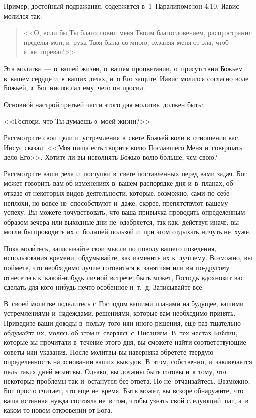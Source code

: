 \documentclass[12pt,article,a4paper,fittopage]{ncc}
\begin{document}
\begin{multicols}{2}
Пример, достойный подражания, содержится в~1~Паралипоменон 4:10. Иавис молился так: 

\begin{quote}
<<О, если бы Ты благословил меня Твоим благословением, распространил пределы мои, и~рука Твоя была со мною, охраняя меня от зла, чтоб я~не~горевал!>>
\end{quote}

 Эта молитва~--- о~вашей жизни, о~вашем процветании, о~присутствии Божьем в~вашем сердце и~в~ваших делах, и~о Его защите. Иавис молился согласно воле Божьей, и~Бог ниспослал ему, чего он просил.

Основной настрой третьей части этого дня молитвы должен быть: 
\begin{center}
<<Господи, что Ты думаешь о~моей жизни?>>
\end{center}
 Рассмотрите свои цели и~устремления в~свете Божьей воли в~отношении вас. Иисус сказал: <<Моя пища есть творить волю Пославшего Меня и~совершать дело Его>>. Хотите ли вы исполнять Божью волю больше, чем свою?

Рассмотрите ваши дела и~поступки в~свете поставленных перед вами задач. Бог может говорить вам об изменениях в~вашем распорядке дня и~в~планах, об отказе от некоторых видов деятельности, которые, возможно, сами по себе неплохи, но вовсе не~способствуют и~даже, скорее, препятствуют вашему успеху. Вы можете почувствовать, что ваша привычка проводить определенным образом вечера или выходные дни не~одобряется, так как, действуя иначе, вы могли бы проводить их с~большей пользой и~при этом отдыхать ничуть не~хуже.

Пока мол\'{и}тесь, записывайте свои мысли по поводу вашего поведения, использования времени, обдумывайте, как изменить их к~лучшему. Возможно, вы поймете, что необходимо лучше готовиться к~занятиям или вы по-другому отнесетесь к~какой-нибудь личной встрече; быть может, Господь вдохновит вас сделать для кого-нибудь нечто особенное и~т.~д. Записывайте всё.

В~своей молитве поделитесь с~Господом вашими планами на будущее, вашими устремлениями и~надеждами, решениями, которые вам необходимо принять. Приведите ваши доводы в~пользу того или иного решения, еще раз тщательно обдумайте их, молясь об этом и~сверяясь с~Писанием. В~тех местах Библии, которые вы прочитали в~течение этого дня, вы сможете найти соответствующие советы или указания. После молитвы вы наверняка обретете твердую определенность на основании ваших выводов. В~этом, собственно, и~заключается цель таких дней молитвы. Однако, вы должны быть готовы и~к тому, что некоторые проблемы так и~останутся без ответа. Но не~отчаивайтесь. Возможно, Бог просто считает, что еще не~время. Быть может, вы вскоре обнаружите, что ваша истинная нужда состояла не~в том, чтобы узнать свой следующий шаг, а~в каком-то новом откровении от Бога. 


\end{multicols}
\end{document}
